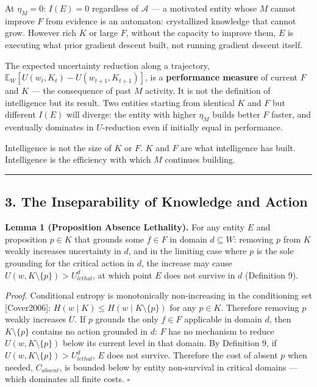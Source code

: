 \documentclass[
]{article}
\begin{document}
At \(\eta_M = 0\): \(I(E) = 0\) regardless of \(\mathcal{A}\) --- a
motivated entity whose \(M\) cannot improve \(F\) from evidence is an
automaton: crystallized knowledge that cannot grow. However rich \(K\)
or large \(F\), without the capacity to improve them, \(E\) is executing
what prior gradient descent built, not running gradient descent itself.

The expected uncertainty reduction along a trajectory,
\(\mathbb{E}_W[U(w_t, K_t) - U(w_{t+1}, K_{t+1})]\), is a
\textbf{performance measure} of current \(F\) and \(K\) --- the
consequence of past \(M\) activity. It is not the definition of
intelligence but its result. Two entities starting from identical \(K\)
and \(F\) but different \(I(E)\) will diverge: the entity with higher
\(\eta_M\) builds better \(F\) faster, and eventually dominates in
\(U\)-reduction even if initially equal in performance.

Intelligence is not the size of \(K\) or \(F\). \(K\) and \(F\) are what
intelligence has built. Intelligence is the efficiency with which \(M\)
continues building.

\begin{center}\rule{0.5\linewidth}{0.5pt}\end{center}

\subsection{3. The Inseparability of Knowledge and
Action}\label{the-inseparability-of-knowledge-and-action}

\textbf{Lemma 1 (Proposition Absence Lethality).} For any entity \(E\)
and proposition \(p \in K\) that grounds some \(f \in F\) in domain
\(d \subseteq W\): removing \(p\) from \(K\) weakly increases
uncertainty in \(d\), and in the limiting case where \(p\) is the sole
grounding for the critical action in \(d\), the increase may cause
\(U(w, K \setminus \{p\}) > U_{lethal}^d\), at which point \(E\) does
not survive in \(d\) (Definition 9).

\emph{Proof.} Conditional entropy is monotonically non-increasing in the
conditioning set {[}Cover2006{]}:
\(H(w \mid K) \leq H(w \mid K \setminus \{p\})\) for any \(p \in K\).
Therefore removing \(p\) weakly increases \(U\). If \(p\) grounds the
only \(f \in F\) applicable in domain \(d\), then \(K \setminus \{p\}\)
contains no action grounded in \(d\): \(F\) has no mechanism to reduce
\(U(w, K \setminus \{p\})\) below its current level in that domain. By
Definition 9, if \(U(w, K \setminus \{p\}) > U_{lethal}^d\), \(E\) does
not survive. Therefore the cost of absent \(p\) when needed,
\(C_{absent}\), is bounded below by entity non-survival in critical
domains --- which dominates all finite costs. \(\square\)
\end{document}
